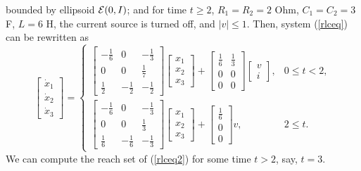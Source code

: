 bounded by ellipsoid $\EE(0,I)$; and for time $t\geq 2$,
$R_1=R_2=2$ Ohm, $C_1=C_2=3$ F, $L=6$ H, the current source is turned off,
and $|v|\leq 1$. Then, system (\ref{rlceq}) can be rewritten as
\begin{equation}
\left[\begin{array}{c}
\dot{x}_1\\
\dot{x}_2\\
\dot{x}_3\end{array}\right] = \left\{\begin{array}{ll}
\left[\begin{array}{ccc}
-\frac{1}{6} & 0 & -\frac{1}{3}\\
0 & 0 & \frac{1}{7}\\
\frac{1}{2} & -\frac{1}{2} & -\frac{1}{2}\end{array}\right]
\left[\begin{array}{c}
x_1\\
x_2\\
x_3\end{array}\right] + \left[\begin{array}{cc}
\frac{1}{6} & \frac{1}{3}\\
0 & 0\\
0 & 0\end{array}\right]\left[\begin{array}{c}
v\\
i\end{array}\right], & 0\leq t< 2, \\
\left[\begin{array}{ccc}
-\frac{1}{6} & 0 & -\frac{1}{3}\\
0 & 0 & \frac{1}{3}\\
\frac{1}{6} & -\frac{1}{6} & -\frac{1}{3}\end{array}\right]
\left[\begin{array}{c}
x_1\\
x_2\\
x_3\end{array}\right] + \left[\begin{array}{c}
\frac{1}{6} \\
0 \\
0 \end{array}\right]v, & 2\leq t. \end{array}\right.
\label{rlceq2}
\end{equation}
We can compute the reach set of (\ref{rlceq2}) for some time $t>2$, say, $t=3$.



